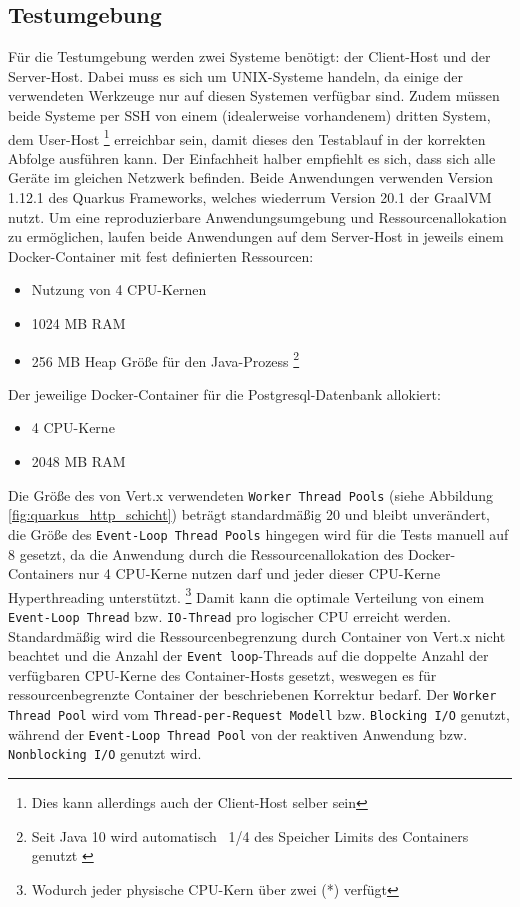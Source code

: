 \subsection{Testumgebung}
\label{section:testumgebung}
Für die Testumgebung werden zwei Systeme benötigt: der Client-Host und der Server-Host.
Dabei muss es sich um UNIX-Systeme handeln, da einige der verwendeten Werkzeuge nur auf diesen Systemen verfügbar sind.
Zudem müssen beide Systeme per SSH von einem (idealerweise vorhandenem) dritten System, dem User-Host
\footnote{Dies kann allerdings auch der Client-Host selber sein}
erreichbar sein, damit dieses den Testablauf in der korrekten Abfolge ausführen kann.
Der Einfachheit halber empfiehlt es sich, dass sich alle Geräte im gleichen Netzwerk befinden.
Beide Anwendungen verwenden Version 1.12.1 des Quarkus Frameworks, welches wiederrum Version 20.1 der GraalVM nutzt.
Um eine reproduzierbare Anwendungsumgebung und Ressourcenallokation zu ermöglichen, laufen beide Anwendungen auf dem Server-Host in
jeweils einem Docker-Container mit fest definierten Ressourcen:
\begin{itemize}
    \item Nutzung von 4 CPU-Kernen
    \item 1024 MB RAM
    \item 256 MB Heap Größe für den Java-Prozess
          \footnote{Seit Java 10 wird automatisch ~1/4 des Speicher Limits des Containers genutzt \parencite{Java10ReleaseNotes}}
\end{itemize}
Der jeweilige Docker-Container für die Postgresql-Datenbank allokiert:
\begin{itemize}
    \item 4 CPU-Kerne
    \item 2048 MB RAM
\end{itemize}

Die Größe des von Vert.x verwendeten \verb|Worker Thread Pools| (siehe Abbildung \ref{fig:quarkus_http_schicht}) beträgt standardmäßig 20 und bleibt
unverändert, die Größe des \verb|Event-Loop Thread Pools| hingegen wird für die Tests manuell auf 8 gesetzt, da die Anwendung durch die Ressourcenallokation
des Docker-Containers nur 4 CPU-Kerne nutzen darf und jeder dieser CPU-Kerne Hyperthreading unterstützt. \footnote{Wodurch jeder physische CPU-Kern über
    zwei (*) verfügt} Damit kann die optimale Verteilung von einem \verb|Event-Loop Thread| bzw. \verb|IO-Thread| pro
logischer CPU erreicht werden.
Standardmäßig wird die Ressourcenbegrenzung durch Container von Vert.x nicht beachtet und die Anzahl der \verb|Event loop|-Threads auf die doppelte
Anzahl der verfügbaren CPU-Kerne des Container-Hosts gesetzt, weswegen es für ressourcenbegrenzte Container der beschriebenen Korrektur bedarf.
Der \verb|Worker Thread Pool| wird vom \verb|Thread-per-Request Modell| bzw. \verb|Blocking I/O| genutzt, während der \verb|Event-Loop Thread Pool| von der
reaktiven Anwendung bzw. \verb|Nonblocking I/O| genutzt wird.

